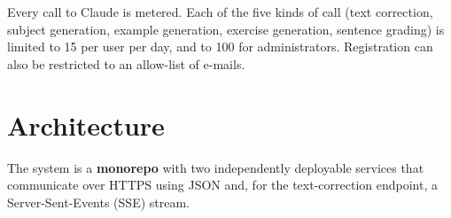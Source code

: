 \documentclass[11pt,a4paper]{article}
\begin{document}
Every call to Claude is metered. Each of the five kinds of call (text
correction, subject generation, example generation, exercise generation,
sentence grading) is limited to 15 per user per day, and to 100 for
administrators. Registration can also be restricted to an allow-list of
e-mails.

\section{Architecture}

The system is a \textbf{monorepo} with two independently deployable services
that communicate over HTTPS using JSON and, for the text-correction endpoint, a
Server-Sent-Events (SSE) stream.
\end{document}
